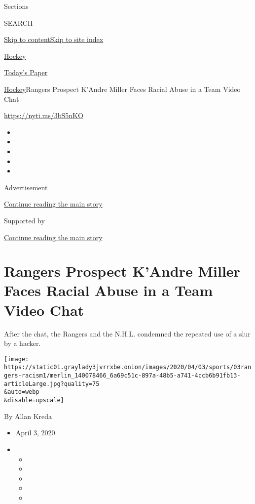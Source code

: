 Sections

SEARCH

\protect\hyperlink{site-content}{Skip to
content}\protect\hyperlink{site-index}{Skip to site index}

\href{https://www.nytimes3xbfgragh.onion/section/sports/hockey}{Hockey}

\href{https://myaccount.nytimes3xbfgragh.onion/auth/login?response_type=cookie\&client_id=vi}{}

\href{https://www.nytimes3xbfgragh.onion/section/todayspaper}{Today's
Paper}

\href{/section/sports/hockey}{Hockey}\textbar{}Rangers Prospect K'Andre
Miller Faces Racial Abuse in a Team Video Chat

\url{https://nyti.ms/3bS5nKO}

\begin{itemize}
\item
\item
\item
\item
\item
\end{itemize}

Advertisement

\protect\hyperlink{after-top}{Continue reading the main story}

Supported by

\protect\hyperlink{after-sponsor}{Continue reading the main story}

\hypertarget{rangers-prospect-kandre-miller-faces-racial-abuse-in-a-team-video-chat}{%
\section{Rangers Prospect K'Andre Miller Faces Racial Abuse in a Team
Video
Chat}\label{rangers-prospect-kandre-miller-faces-racial-abuse-in-a-team-video-chat}}

After the chat, the Rangers and the N.H.L. condemned the repeated use of
a slur by a hacker.

\texttt{[image: https://static01.graylady3jvrrxbe.onion/images/2020/04/03/sports/03rangers-racism1/merlin\_140078466\_6a69c51c-897a-48b5-a741-4ccb6b91fb13-articleLarge.jpg?quality=75\\\&auto=webp\\\&disable=upscale]}

By Allan Kreda

\begin{itemize}
\item
  April 3, 2020
\item
  \begin{itemize}
  \item
  \item
  \item
  \item
  \item
  \end{itemize}
\end{itemize}

